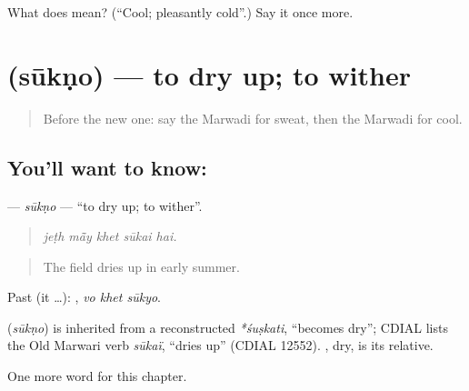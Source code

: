 \begin{tcolorbox}[breakable,colback=teal!4,colframe=teal!35!black,title={Before you move on}]
What does  mean? (\textquotedblleft{}Cool; pleasantly cold\textquotedblright{}.) Say it once more.
\end{tcolorbox}
\section[\texorpdfstring{\mw{सूकणो} (sūkṇo)}{सूकणो (sūkṇo)}]{ (sūkṇo) — to dry up; to wither}

\label{lesson:MW-C228-sukno}



\begin{quote}
Before the new one: say the Marwadi for sweat, then the Marwadi for cool.
\end{quote}

\subsection*{You'll want to know: }
\textbf{} — \emph{sūkṇo} — \textquotedblleft{}to dry up; to wither\textquotedblright{}.

\begin{quote}
    
\end{quote}

\begin{quote}
\emph{jeṭh mā̃y khet sūkai hai.}
\end{quote}

\begin{quote}
The field dries up in early summer.
\end{quote}

Past (it …):   , \emph{vo khet sūkyo}.

\begin{cousinweb}
\textbf{} (\emph{sūkṇo}) is inherited from a reconstructed \emph{*śuṣkati}, \textquotedblleft{}becomes dry\textquotedblright{}; CDIAL lists the Old Marwari verb \emph{sūkaï}, \textquotedblleft{}dries up\textquotedblright{} (CDIAL 12552). \textbf{}, dry, is its relative.
\end{cousinweb}

\begin{grammarlens}[title={What you've built}]
One more word for this chapter.
\end{grammarlens}

